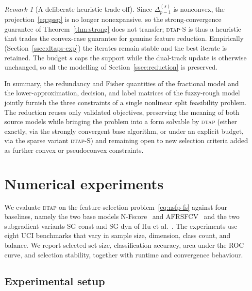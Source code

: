 \documentclass[]{interact}
\theoremstyle{plain}
\theoremstyle{definition}
\theoremstyle{remark}
\newtheorem{remark}{Remark}
\newcommand{\dtap}{\textsc{dtap}}
\begin{document}
\begin{remark}[A deliberate heuristic trade-off]\label{rem:dtaps}
Since $\Delta_{p-1}^{(s)}$ is nonconvex, the projection~\eqref{eq:gssp} is no longer nonexpansive, so the strong-convergence guarantee of Theorem~\ref{thm:strong} does not transfer; \dtap-S is thus a heuristic that trades the convex-case guarantee for genuine feature reduction. Empirically (Section~\ref{ssec:dtaps-exp}) the iterates remain stable and the best iterate is retained. The budget $s$ caps the support while the dual-track update is otherwise unchanged, so all the modelling of Section~\ref{ssec:reduction} is preserved.
\end{remark}

In summary, the redundancy and Fisher quantities of the fractional model and the lower-approximation, decision, and label matrices of the fuzzy-rough model jointly furnish the three constraints of a single nonlinear split feasibility problem. The reduction reuses only validated objectives, preserving the meaning of both source models while bringing the problem into a form solvable by \dtap{} (either exactly, via the strongly convergent base algorithm, or under an explicit budget, via the sparse variant \dtap-S) and remaining open to new selection criteria added as further convex or pseudoconvex constraints.





\section{Numerical experiments}\label{sec:experiments}
We evaluate \dtap{} on the feature-selection problem~\eqref{eq:nsfp-fs} against four baselines, namely the two base models N-Fscore~\citep{wang2021fractional} and AFRSFCV~\citep{wang2026afrsfcv} and the two subgradient variants SG-const and SG-dyn of Hu et al.~\citep{hu2022quasi}. The experiments use eight UCI benchmarks that vary in sample size, dimension, class count, and balance. We report selected-set size, classification accuracy, area under the ROC curve, and selection stability, together with runtime and convergence behaviour.

\subsection{Experimental setup}\label{ssec:setup}
\end{document}
